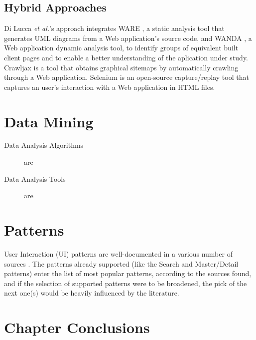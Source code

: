 \subsection{Hybrid Approaches}
Di Lucca \textit{et al.}'s approach \cite{di2005integrating} integrates WARE \cite{di2004reverse}, a static analysis tool that generates UML diagrams from a Web application's source code, and WANDA \cite{antoniol2004understanding}, a Web application dynamic analysis tool, to identify groups of equivalent built client pages and to enable a better understanding of the aplication under study. 
Crawljax \cite{roest2010automated} is a tool that obtains graphical sitemaps by automatically crawling through a Web application. 
Selenium \cite{selenium} is an open-source capture/replay tool that captures an user's interaction with a Web application in HTML files.





\section{Data Mining}\label{sec:datamining}

\begin{description}
\item[Data Analysis Algorithms]  are

\item[Data Analysis Tools]  are
\end{description}


\section{Patterns}\label{sec:patterns}
User Interaction (UI) patterns are well-documented in a various number of sources \cite{tidwell2010designing,van2001patterns, neil12standard,sinnig2005patterns}. The patterns already supported (like the Search and Master/Detail patterns) enter the list of most popular patterns, according to the sources found, and if the selection of supported patterns were to be broadened, the pick of the next one(s) would be heavily influenced by the literature.





\section{Chapter Conclusions}
